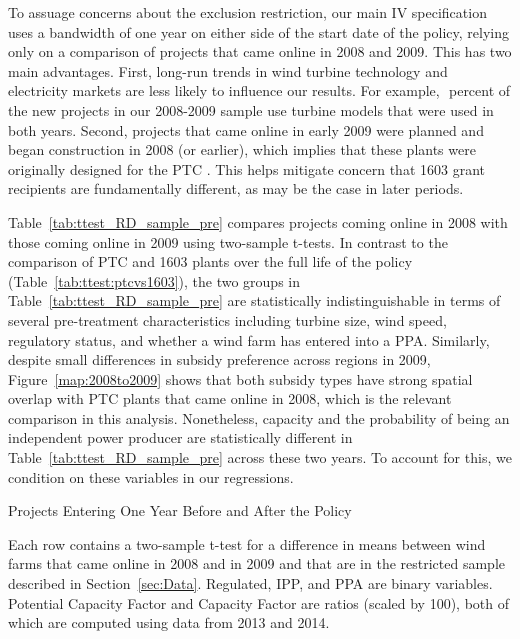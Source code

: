 \documentclass[12pt]{article}
\begin{document}
To assuage concerns about the exclusion restriction, our main IV specification uses a bandwidth of one year on either side of the start date of the policy, relying only on a comparison of projects that came online in 2008 and 2009. This has two main advantages. First, long-run trends in wind turbine technology and electricity markets are less likely to influence our results. For example, $$ percent of the new projects in our 2008-2009 sample use turbine models that were used in both years. Second, projects that came online in early 2009 were planned and began construction in 2008 (or earlier), which implies that these plants were originally designed for the PTC \citep{bolinger_preliminary_2010}. This helps mitigate concern that 1603 grant recipients are fundamentally different, as may be the case in later periods. 

Table~\ref{tab:ttest_RD_sample_pre} compares projects coming online in 2008 with those coming online in 2009 using two-sample t-tests. In contrast to the comparison of PTC and 1603 plants over the full life of the policy (Table~\ref{tab:ttest:ptcvs1603}), the two groups in Table~\ref{tab:ttest_RD_sample_pre} are statistically indistinguishable in terms of several pre-treatment characteristics including turbine size, wind speed, regulatory status, and whether a wind farm has entered into a PPA. Similarly, despite small differences in subsidy preference across regions in 2009, Figure~\ref{map:2008to2009} shows that both subsidy types have strong spatial overlap with PTC plants that came online in 2008, which is the relevant comparison in this analysis. Nonetheless, capacity and the probability of being an independent power producer are statistically different in Table~\ref{tab:ttest_RD_sample_pre} across these two years. To account for this, we condition on these variables in our regressions. 

\begin{table}[H]
\caption{Projects Entering One Year Before and After the Policy\label{tab:ttest_RD_sample_pre}}

\footnotesize
Each row contains a two-sample t-test for a difference in means between wind farms that came online in 2008 and in 2009 and that are in the restricted sample described in Section~\ref{sec:Data}. Regulated, IPP, and PPA are binary variables. Potential Capacity Factor and Capacity Factor are ratios (scaled by 100), both of which are computed using data from 2013 and 2014.
\end{table}
\end{document}
